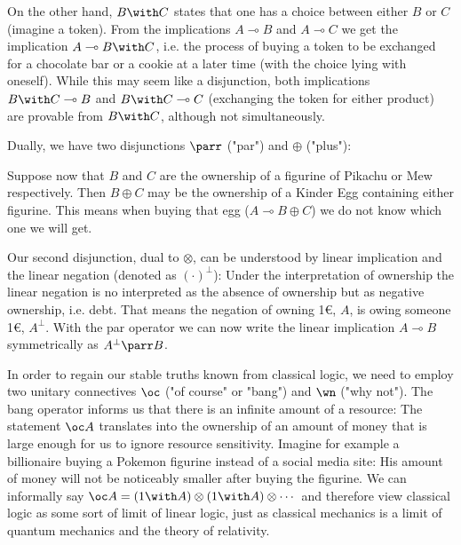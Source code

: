 \documentclass[DIN, pagenumber=false, fontsize=11pt, parskip=half, colorinlistoftodos, svgnames]{scrartcl}
\begin{document}
	On the other hand, $B \with C$ states that one has a choice between either $B$ or $C$ (imagine a token). From the implications $A\multimap B$ and $A\multimap C$ we get the implication $A \multimap B \with C$, i.e. the process of buying a token to be exchanged for a chocolate bar or a cookie at a later time (with the choice lying with oneself). While this may  seem like a disjunction, both implications $B\with C \multimap B$ and $B \with C \multimap C$ (exchanging the token for either product) are provable from $B \with C$, although not simultaneously. 
	
	Dually, we have two disjunctions $\parr$ ("par") and $\oplus$ ("plus"):
	
	Suppose now that $B$ and $C$ are the ownership of a figurine of Pikachu or Mew respectively. Then $B \oplus C$ may be the ownership of a Kinder Egg containing either figurine. This means when buying that egg ($A \multimap B \oplus C$) we do not know which one we will get. 
	
	Our second disjunction, dual to $\otimes$, can be understood by linear implication and the linear negation (denoted as $(\cdot)^\bot$): Under the interpretation of ownership the linear negation is no interpreted as the absence of ownership but as negative ownership, i.e. debt. That means the negation of owning 1\euro, $A$, is owing someone 1\euro, $A^\bot$. With the par operator we can now write the linear implication $A \multimap B$ symmetrically as $A^\bot \parr B$. 
	
	In order to regain our stable truths known from classical logic, we need to employ two unitary connectives $\oc$ ("of course" or "bang") and $\wn$ ("why not"). The bang operator informs us that there is an infinite amount of a resource: The statement $\oc A$ translates into the ownership of an amount of money that is large enough for us to ignore resource sensitivity. Imagine for example a billionaire buying a Pokemon figurine instead of a social media site: His amount of money will not be noticeably smaller after buying the figurine. We can informally say $\oc A = (1 \with A) \otimes (1 \with A) \otimes \cdots $ and therefore view classical logic as some sort of limit of linear logic, just as classical mechanics is a limit of quantum mechanics and the theory of relativity. 
	
\end{document}
